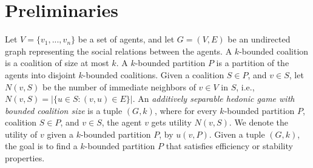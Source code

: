 \documentclass[sigconf,anonymous]{aamas}
\begin{document}
\section{Preliminaries}
Let $V=\{v_1, ..., v_n\}$ be a set of agents, and let $G=(V,E)$ be an undirected graph representing the social relations between the agents. 
A $k$-bounded coalition is a coalition of size at most $k$. A $k$-bounded partition $P$ is a partition of the agents into disjoint $k$-bounded coalitions. Given a coalition $S \in P$, and $v\in S$, let $N(v,S)$ be the number of immediate neighbors of $v \in V$ in $S$, i.e., $N(v,S) = |\{u \in S : (v,u) \in E\}|$.
An \textit{additively separable hedonic game with bounded coalition size} is a tuple $(G,k)$, where for every $k$-bounded partition $P$, coalition $S \in P$, and $v \in S$, the agent $v$ gets utility $N(v,S)$. We denote the utility of $v$ given a $k$-bounded partition $P$, by $u(v,P)$. Given a tuple $(G,k)$, the goal is to find a $k$-bounded partition $P$ that satisfies efficiency or stability properties.
\end{document}
